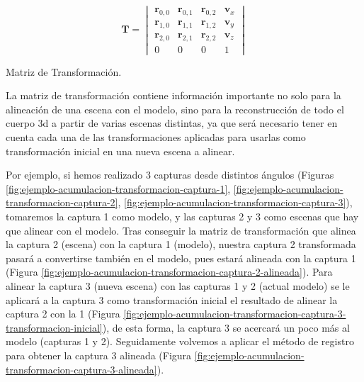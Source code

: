 \begin{customequation}[h!]
    \begin{equation}
        \mathbf{T} =
        \begin{vmatrix}
            \mathbf{r}_{0,0} & \mathbf{r}_{0,1} & \mathbf{r}_{0,2} & \mathbf{v}_{x} \\
            \mathbf{r}_{1,0} & \mathbf{r}_{1,1} & \mathbf{r}_{1,2} & \mathbf{v}_{y} \\
            \mathbf{r}_{2,0} & \mathbf{r}_{2,1} & \mathbf{r}_{2,2} & \mathbf{v}_{z} \\
            0 & 0 & 0 & 1
        \end{vmatrix}
    \end{equation}
    \caption{Matriz de Transformación.}
    \label{eq:matriz-transformacion}
\end{customequation}

La matriz de transformación contiene información importante no solo para la alineación de una escena con el modelo, sino para la reconstrucción de todo el cuerpo \gls{3d} a partir de varias escenas distintas, ya que será necesario tener en cuenta cada una de las transformaciones aplicadas para usarlas como transformación inicial en una nueva escena a alinear.

Por ejemplo, si hemos realizado 3 capturas desde distintos ángulos (Figuras \ref{fig:ejemplo-acumulacion-transformacion-captura-1}, \ref{fig:ejemplo-acumulacion-transformacion-captura-2}, \ref{fig:ejemplo-acumulacion-transformacion-captura-3}), tomaremos la captura 1 como modelo, y las capturas 2 y 3 como escenas que hay que alinear con el modelo.
Tras conseguir la matriz de transformación que alinea la captura 2 (escena) con la captura 1 (modelo), nuestra captura 2 transformada pasará a convertirse también en el modelo, pues estará alineada con la captura 1 (Figura \ref{fig:ejemplo-acumulacion-transformacion-captura-2-alineada}).
Para alinear la captura 3 (nueva escena) con las capturas 1 y 2 (actual modelo) se le aplicará a la captura 3 como transformación inicial el resultado de alinear la captura 2 con la 1 (Figura \ref{fig:ejemplo-acumulacion-transformacion-captura-3-transformacion-inicial}), de esta forma, la captura 3 se acercará un poco más al modelo (capturas 1 y 2).
Seguidamente volvemos a aplicar el método de registro para obtener la captura 3 alineada (Figura \ref{fig:ejemplo-acumulacion-transformacion-captura-3-alineada}).

